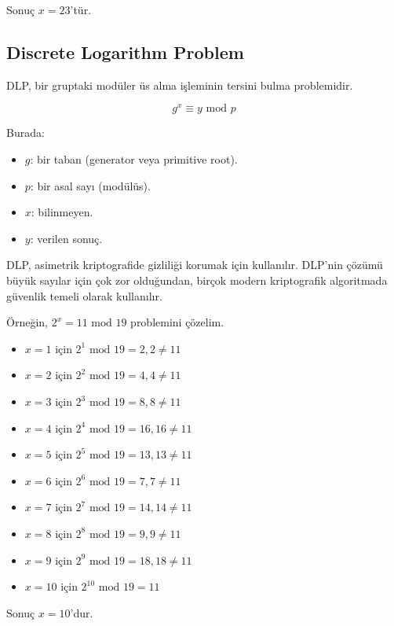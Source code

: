Sonuç $x = 23$'tür.

\newpage

\subsection{Discrete Logarithm Problem}

DLP, bir gruptaki modüler üs alma işleminin tersini bulma problemidir.

\[ g^x \equiv y \text{ mod } p \]

Burada:

\begin{itemize}
    \item $g$: bir taban (generator veya primitive root).
    \item $p$: bir asal sayı (modülüs).
    \item $x$: bilinmeyen.
    \item $y$: verilen sonuç.
\end{itemize}

DLP, asimetrik kriptografide gizliliği korumak için kullanılır. DLP'nin çözümü büyük sayılar için çok zor olduğundan, birçok modern kriptografik algoritmada güvenlik temeli olarak kullanılır. 

Örneğin, $2^x = 11 \text{ mod } 19$ problemini çözelim.

\begin{itemize}
    \item $x = 1$ için $2^1 \text{ mod } 19 = 2, 2 \neq 11$
    \item $x = 2$ için $2^2 \text{ mod } 19 = 4, 4 \neq 11$
    \item $x = 3$ için $2^3 \text{ mod } 19 = 8, 8 \neq 11$
    \item $x = 4$ için $2^4 \text{ mod } 19 = 16, 16 \neq 11$
    \item $x = 5$ için $2^5 \text{ mod } 19 = 13, 13 \neq 11$
    \item $x = 6$ için $2^6 \text{ mod } 19 = 7, 7 \neq 11$
    \item $x = 7$ için $2^7 \text{ mod } 19 = 14, 14 \neq 11$
    \item $x = 8$ için $2^8 \text{ mod } 19 = 9, 9 \neq 11$
    \item $x = 9$ için $2^9 \text{ mod } 19 = 18, 18 \neq 11$
    \item $x = 10$ için $2^10 \text{ mod } 19 = 11$
\end{itemize}

Sonuç $x = 10$'dur.

\newpage

